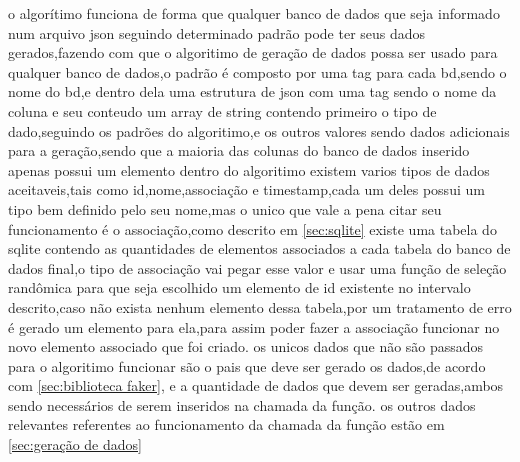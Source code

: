 \documentclass[
	12pt,				%
	openright,			%
	oneside,			%
	a4paper,			%
	english,			%
	french,				%
	spanish,			%
	brazil,				%
	]{abntex2}
\begin{document}
o algorítimo funciona de forma que qualquer banco de dados que seja informado num arquivo json seguindo determinado padrão pode ter seus dados gerados,fazendo com que o algoritimo de geração de dados possa ser usado para qualquer banco de dados,o padrão é composto por uma tag para cada bd,sendo o nome do bd,e dentro dela uma estrutura de json com uma tag sendo o nome da coluna e seu conteudo um array de string contendo primeiro o tipo de dado,seguindo os padrões do algoritimo,e os outros valores sendo dados adicionais para a geração,sendo que a maioria das colunas do banco de dados inserido apenas possui um elemento\newline
dentro do algoritimo existem varios tipos de dados aceitaveis,tais como id,nome,associação e timestamp,cada um deles possui um tipo bem definido pelo seu nome,mas o unico que vale a pena citar seu funcionamento é o associação,como descrito em \autoref{sec:sqlite} existe uma tabela do sqlite contendo as quantidades de elementos associados a cada tabela do banco de dados final,o tipo de associação vai pegar esse valor e usar uma função de seleção randômica para que seja escolhido um elemento de id existente no intervalo descrito,caso não exista nenhum elemento dessa tabela,por um tratamento de erro é gerado um elemento para ela,para assim poder fazer a associação funcionar no novo elemento associado que foi criado.\newline
os unicos dados que não são passados para o algoritimo funcionar são o pais que deve ser gerado os dados,de acordo com \autoref{sec:biblioteca faker}, e a quantidade de dados que devem ser geradas,ambos sendo necessários de serem inseridos na chamada da função.
os outros dados relevantes referentes ao funcionamento da chamada da função estão em \autoref{sec:geração de dados}
\end{document}
